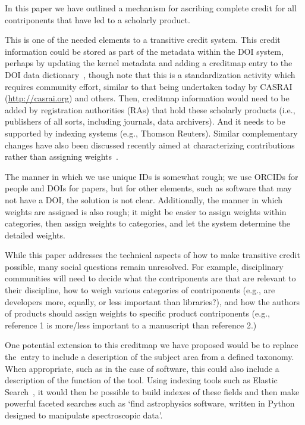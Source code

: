 \documentclass[a4paper,10pt]{article}
\begin{document}
In this paper we have outlined a mechanism for ascribing complete credit for all contriponents that have led to a scholarly product.

This is one of the needed elements to a transitive credit system.  This credit information could be stored as part of the metadata within the DOI system, perhaps by updating the kernel metadata and adding a creditmap entry to the DOI data dictionary~\cite{DOI-data-model}, though note that this is a standardization activity which requires community effort, similar to that being undertaken today by CASRAI (\url{http://casrai.org}) and others. Then, creditmap information would need to be added by registration authorities (RAs) that hold these scholarly products (i.e., publishers of all sorts, including journals, data archivers).  And it needs to be supported by indexing systems (e.g., Thomson Reuters). Similar complementary changes have also been discussed recently aimed at characterizing contributions rather than assigning  weights~\cite{metatags,contributorship-taxonomy,teams}.

The manner in which we use unique IDs is somewhat rough; we use ORCIDs for people and DOIs for papers, but for other elements, such as software that may not have a DOI, the solution is not clear.
Additionally, the manner in which weights are assigned is also rough; it might be easier to assign weights within categories, then assign weights to categories, and let the system determine the detailed weights.

While this paper addresses the technical aspects of how to make transitive credit possible, many social questions remain unresolved. For example, disciplinary communities will need to decide what the contriponents are that are relevant to their discipline, how to weigh various categories of contriponents (e.g., are developers more, equally, or less important than libraries?), and how the authors of products should assign weights to specific product contriponents (e.g., reference 1 is more/less important to a manuscript than reference 2.) 

One potential extension to this creditmap we have proposed would be to replace the~\keywords entry to include a description of the subject area from a defined taxonomy. When appropriate, such as in the case of software, this could also include a description of the function of the tool. Using indexing tools such as Elastic Search~\cite{elasticsearch}, it would then be possible to build indexes of these fields and then make powerful faceted searches such as `find astrophysics software, written in Python designed to manipulate spectroscopic data'.
\end{document}
